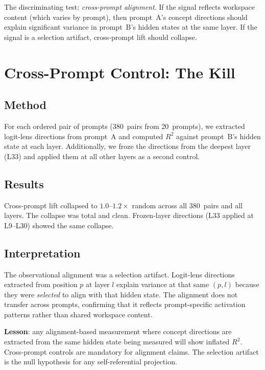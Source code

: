 \documentclass[11pt,a4paper]{article}
\begin{document}
The discriminating test: \emph{cross-prompt alignment}. If the signal
reflects workspace content (which varies by prompt), then prompt~A's
concept directions should explain significant variance in prompt~B's
hidden states at the same layer. If the signal is a selection artifact,
cross-prompt lift should collapse.

\section{Cross-Prompt Control: The Kill}
\label{sec:crossprompt}

\subsection{Method}

For each ordered pair of prompts (380~pairs from 20~prompts), we
extracted logit-lens directions from prompt~A and computed $R^2$
against prompt~B's hidden state at each layer. Additionally, we
froze the directions from the deepest layer (L33) and applied them
at all other layers as a second control.

\subsection{Results}

Cross-prompt lift collapsed to $1.0$--$1.2\times$ random across all
380~pairs and all layers. The collapse was total and clean. Frozen-layer
directions (L33 applied at L9--L30) showed the same collapse.

\subsection{Interpretation}

The observational alignment was a selection artifact. Logit-lens
directions extracted from position $p$ at layer $l$ explain variance
at that same $(p, l)$ because they were \emph{selected} to align with
that hidden state. The alignment does not transfer across prompts,
confirming that it reflects prompt-specific activation patterns rather
than shared workspace content.

\textbf{Lesson}: any alignment-based measurement where concept
directions are extracted from the same hidden state being measured will
show inflated $R^2$. Cross-prompt controls are mandatory for alignment
claims. The selection artifact is the null hypothesis for any
self-referential projection.
\end{document}

